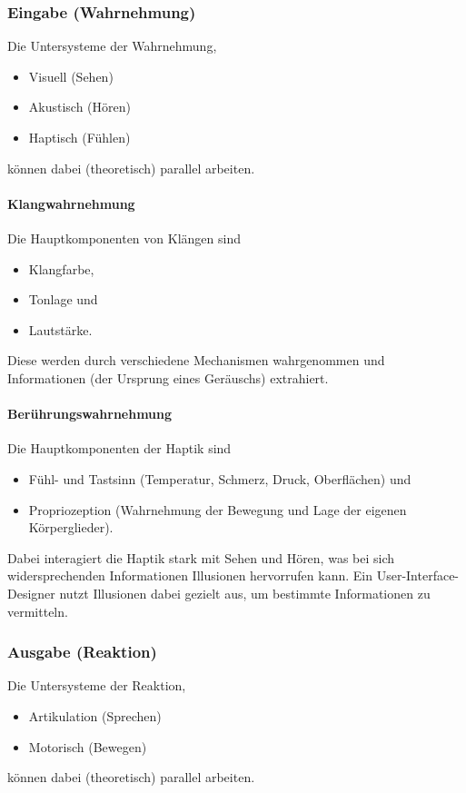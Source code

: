 			\subsubsection{Eingabe (Wahrnehmung)}
				Die Untersysteme der Wahrnehmung,
				\begin{itemize}
					\item Visuell (Sehen)
					\item Akustisch (Hören)
					\item Haptisch (Fühlen)
				\end{itemize}
				können dabei (theoretisch) parallel arbeiten.

				\paragraph{Klangwahrnehmung}
					Die Hauptkomponenten von Klängen sind
					\begin{itemize}
						\item Klangfarbe,
						\item Tonlage und
						\item Lautstärke.
					\end{itemize}
					Diese werden durch verschiedene Mechanismen wahrgenommen und Informationen (\zB der Ursprung eines Geräuschs) extrahiert.

				\paragraph{Berührungswahrnehmung}
					Die Hauptkomponenten der Haptik sind
					\begin{itemize}
						\item Fühl- und Tastsinn (Temperatur, Schmerz, Druck, Oberflächen) und
						\item Propriozeption (Wahrnehmung der Bewegung und Lage der eigenen Körperglieder).
					\end{itemize}
					Dabei interagiert die Haptik stark mit Sehen und Hören, was bei sich widersprechenden Informationen Illusionen hervorrufen kann. Ein User-Interface-Designer nutzt Illusionen dabei gezielt aus, um bestimmte Informationen zu vermitteln.

			\subsubsection{Ausgabe (Reaktion)}
				Die Untersysteme der Reaktion,
				\begin{itemize}
					\item Artikulation (Sprechen)
					\item Motorisch (Bewegen)
				\end{itemize}
				können dabei (theoretisch) parallel arbeiten.

